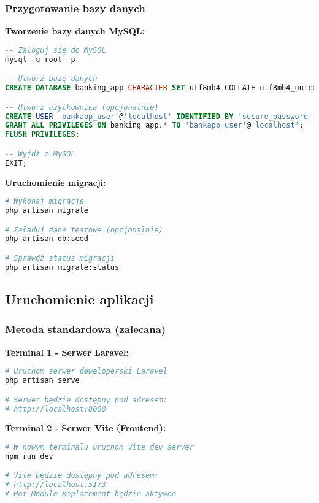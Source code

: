 \documentclass[12pt,a4paper]{article}
\begin{document}
    \subsubsection{Przygotowanie bazy danych}

    \textbf{Tworzenie bazy danych MySQL:}
    \begin{lstlisting}[language=sql, caption=SQL dla tworzenia bazy danych]
-- Zaloguj się do MySQL
mysql -u root -p

-- Utwórz bazę danych
CREATE DATABASE banking_app CHARACTER SET utf8mb4 COLLATE utf8mb4_unicode_ci;

-- Utwórz użytkownika (opcjonalnie)
CREATE USER 'bankapp_user'@'localhost' IDENTIFIED BY 'secure_password';
GRANT ALL PRIVILEGES ON banking_app.* TO 'bankapp_user'@'localhost';
FLUSH PRIVILEGES;

-- Wyjdź z MySQL
EXIT;
    \end{lstlisting}

    \textbf{Uruchomienie migracji:}
    \begin{lstlisting}[language=bash, caption=Migracje bazy danych]
# Wykonaj migracje
php artisan migrate

# Załaduj dane testowe (opcjonalnie)
php artisan db:seed

# Sprawdź status migracji
php artisan migrate:status
    \end{lstlisting}

    \subsection{Uruchomienie aplikacji}

    \subsubsection{Metoda standardowa (zalecana)}

    \textbf{Terminal 1 - Serwer Laravel:}
    \begin{lstlisting}[language=bash, caption=Uruchomienie serwera Laravel]
# Uruchom serwer deweloperski Laravel
php artisan serve

# Serwer będzie dostępny pod adresem:
# http://localhost:8000
    \end{lstlisting}

    \textbf{Terminal 2 - Serwer Vite (Frontend):}
    \begin{lstlisting}[language=bash, caption=Uruchomienie serwera Vite]
# W nowym terminalu uruchom Vite dev server
npm run dev

# Vite będzie dostępny pod adresem:
# http://localhost:5173
# Hot Module Replacement będzie aktywne
    \end{lstlisting}
\end{document}

